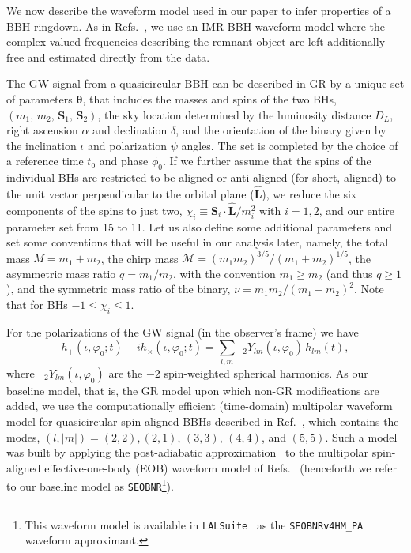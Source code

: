 \documentclass[twocolumn,
               prd,
               aps,
               superscriptaddress,
               tightenlines,
               nofootinbib,
               eqsecnum,
               amsfonts,
               amsmath,
               longbibliography]{revtex4-1}
\newcommand{\SEOB}{\texttt{SEOBNR}}
\newcommand{\abcomm}[1]{{\textcolor{red}{{[AB: #1]}}}}
\begin{document}
We now describe the waveform model used in our paper to infer properties of a
BBH ringdown.
%
As in Refs.~\cite{Brito:2018rfr,Ghosh:2021mrv}, we use an IMR BBH waveform
model where the complex-valued frequencies describing the remnant object
are left additionally free and estimated directly from the data.

The GW signal from a quasicircular BBH can be described  in GR by a unique set of
parameters $\bm{\theta}$, that includes the masses and spins of the two BHs,
$(m_1,\, m_2,\, \mathbf{S}_1,\, \mathbf{S}_2)$, the sky location determined by the
luminosity distance $D_L$,
right ascension $\alpha$ and declination $\delta$,
and the orientation of the binary given by the inclination $\iota$ and polarization $\psi$
angles.
%
The set is completed by the choice of a reference time $t_0$ and phase
$\phi_0$. If we further assume that the spins of the individual BHs are
restricted to be aligned or anti-aligned (for short, aligned) to the unit vector
perpendicular to the orbital plane ($\mathbf{\hat{L}}$), we reduce the six
components of the spins to just two, $\chi_i \equiv \mathbf{S}_i\cdot \mathbf{\hat{L}} /m_i^2$ with $i = 1,2$,
and our entire parameter set from 15 to 11.
%
Let us also define some additional parameters and set some conventions that
will be useful in our analysis later, namely, the total mass
%
$M=m_1+m_2$,
%
the chirp mass
%
$\mathcal {M}=(m_{1}m_{2})^{3/5}/(m_{1}+m_{2})^{1/5}$,
%
the asymmetric mass ratio $q=m_1/m_2$, with the convention $m_1 \geqslant m_2$ (and thus $q \geqslant 1$),
and the symmetric mass ratio of the binary, $\nu = m_1m_2/(m_1+m_2)^2$. Note that for BHs $-1 \leqslant \chi_i \leqslant 1$.

For the polarizations of the GW signal (in the observer's frame) we have
%
\begin{equation}
h_+(\iota,\varphi_0;t ) - i h_\times(\iota,\varphi_0;t) = \sum_{l, m} {}_{-\!2}Y_{l m}(\iota,\varphi_0)\, h_{l m}(t),
\end{equation}
%
where ${}_{-\!2}Y_{l m}(\iota,\varphi_0)$ are the $-2$ spin-weighted spherical
harmonics.
%
%
As our baseline model, that is, the GR model upon which non-GR modifications
are added, we use the computationally efficient (time-domain) multipolar
waveform model for quasicircular spin-aligned BBHs described in
Ref.~\cite{Mihaylov:2021bpf}, which contains the modes, $(l, |m|)=(2,2),(2,1)$, $(3,3)$, $(4,4)$,
and $(5,5)$. Such a model was built by applying the post-adiabatic approximation~\cite{Nagar:2018gnk}
to the multipolar spin-aligned effective-one-body (EOB) waveform model of Refs.~\cite{Bohe:2016gbl,Cotesta:2018fcv} (henceforth we refer to our baseline model as \SEOB{}\footnote{This waveform
model is available in \texttt{LALSuite}~\cite{lalsuite} as the \texttt{SEOBNRv4HM\_PA}
waveform approximant.}).
\end{document}
